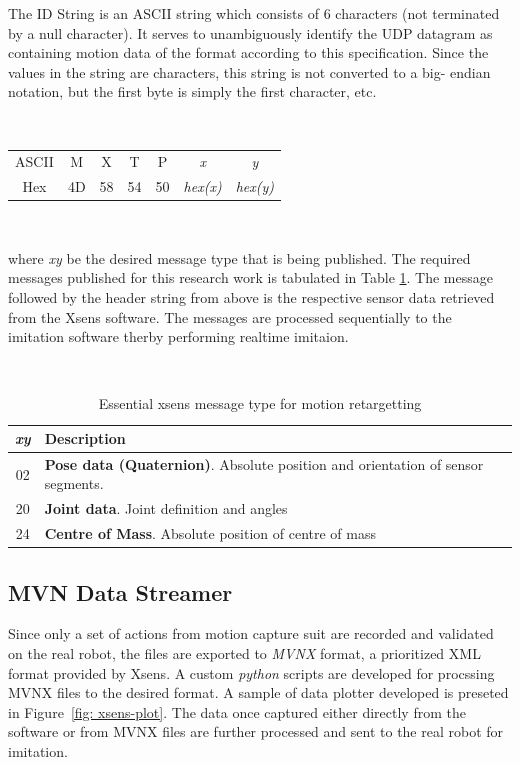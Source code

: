 The ID String is an ASCII string which consists of 6 characters (not terminated by a null character). It serves to unambiguously identify the UDP datagram as containing motion data of the 
format according to this specification. Since the values in the string are characters, this string is not converted to a big- endian notation, but the first byte is simply the first character, etc.

~

\begin{tabular}{ccccccc}
    ASCII & M & X & T & P & \textit{x} & \textit{y} \\
    Hex & 4D & 58 & 54 & 50 & \textit{hex(x)} & \textit{hex(y)} \\
\end{tabular}

~

where \textit{xy} be the desired message type that is being published. The required messages published for this research work is tabulated in Table \ref{tab: xsens-message}. The message followed by the 
header string from above is the respective sensor data retrieved from the Xsens software. The messages are processed sequentially to the imitation software therby performing realtime imitaion.

~

\begin{table}[h!]
    \label{tab: xsens-message}
    \begin{tabular}{|c|l|}
        \hline
        \textbf{\textit{xy}} & \textbf{Description} \\
        \hline
        02 & \textbf{Pose data (Quaternion)}. Absolute position and orientation of sensor segments. \\
        \hline 
        20 & \textbf{Joint data}. Joint definition and angles \\
        \hline
        24 & \textbf{Centre of Mass}. Absolute position of centre of mass \\
        \hline
    \end{tabular}
    \caption{Essential xsens message type for motion retargetting}
\end{table}

\subsection{MVN Data Streamer}

Since only a set of actions from motion capture suit are recorded and validated on the real robot, the files are exported to \textit{MVNX} format, a prioritized XML format provided by Xsens. A custom \textit{python} scripts are developed 
for procssing MVNX files to the desired format. A sample of data plotter developed is preseted in Figure~\ref{fig: xsens-plot}. The data once captured either
directly from the software or from MVNX files are further processed and sent to the real robot for imitation.  


